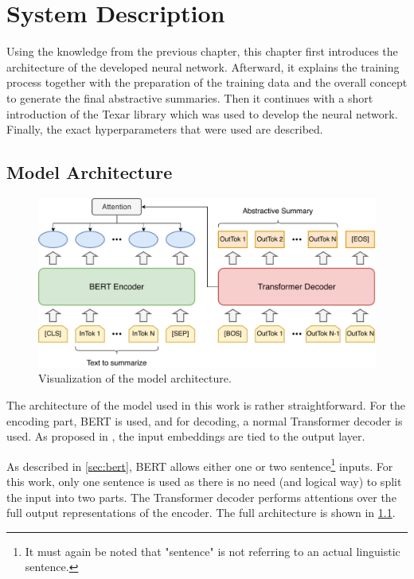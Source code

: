 \chapter{System Description}\label{ch:system-description}

Using the knowledge from the previous chapter, this chapter first introduces the architecture of the developed neural network.
Afterward, it explains the training process together with the preparation of the training data and the overall concept to generate the final abstractive summaries.
Then it continues with a short introduction of the Texar library \cite{hu2019texar} which was used to develop the neural network.
Finally, the exact hyperparameters that were used are described.


\section{Model Architecture}
 
\begin{figure}[h]
\centering
\includegraphics[width=0.7\paperwidth]{figures/summarization-architecture}
\caption{Visualization of the model architecture.}
\label{fig:summarization-architecture}
\end{figure}

The architecture of the model used in this work is rather straightforward.
For the encoding part, BERT is used, and for decoding, a normal Transformer decoder is used.
As proposed in \cite{1608.05859}, the input embeddings are tied to the output layer.

As described in \cref{sec:bert}, BERT allows either one or two sentence\footnote{It must again be noted that "sentence" is not referring to an actual linguistic sentence.} inputs.
For this work, only one sentence is used as there is no need (and logical way) to split the input into two parts.
The Transformer decoder performs attentions over the full output representations of the encoder.
The full architecture is shown in \cref{fig:summarization-architecture}.

